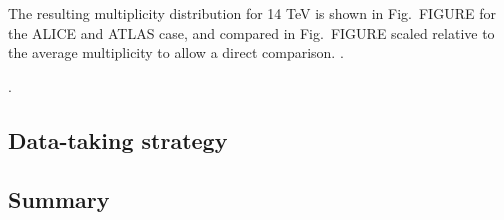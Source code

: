 \documentclass[../report.tex]{subfiles}
\begin{document}
The resulting multiplicity distribution for 14 TeV is shown in Fig.~FIGURE for the ALICE and ATLAS case, and compared in Fig.~FIGURE scaled relative to the average multiplicity to allow a direct comparison. . 

.


\subsection{Data-taking strategy}


\subsection{Summary}
\end{document}
